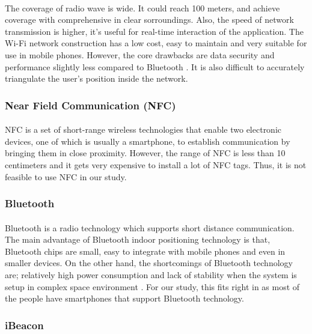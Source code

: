 \documentclass[12pt]{article}
\begin{document}
\paragraph{} The coverage of radio wave is wide. It could reach 100 meters, and achieve coverage with comprehensive in clear sorroundings. Also, the speed of network transmission is higher, it’s useful for real-time interaction of the application. The Wi-Fi network construction has a low cost, easy to maintain and very suitable for use in mobile phones. However, the core drawbacks are data security and performance slightly less compared to Bluetooth \cite{indoor}. It is also difficult to accurately triangulate the user's position inside the network.

\subsubsection{Near Field Communication (NFC)}
\paragraph{}NFC is a set of short-range wireless technologies that enable two electronic devices, one of which is usually a smartphone, to establish communication by bringing them in close proximity. However, the range  of NFC is less than 10 centimeters and it gets very expensive to install a lot of NFC tags. \cite{tracking} Thus, it is not feasible to use NFC in our study.

\subsubsection{Bluetooth}
\paragraph{}Bluetooth is a radio technology which supports short distance communication. The main advantage of Bluetooth indoor positioning technology is that, Bluetooth chips are small, easy to integrate with mobile phones and even in smaller devices. On the other hand, the shortcomings of Bluetooth technology are;  relatively high power consumption and lack of stability when the system is setup in complex space environment \cite{indoor}. For our study, this fits right in as most of the people have smartphones that support Bluetooth technology.

\subsubsection{iBeacon}
\end{document}

